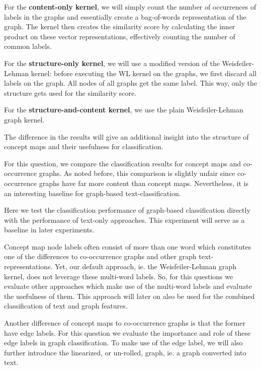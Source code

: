 For the \textbf{content-only kernel}, we will simply count the number of occurrences of labels in the graphs and essentially create a bag-of-words representation of the graph. The kernel then creates the similarity score by calculating the inner product on these vector representations, effectively counting the number of common labels.

For the \textbf{structure-only kernel}, we will use a modified version of the Weisfeiler-Lehman kernel: before executing the WL kernel on the graphs, we first discard all labels on the graph. All nodes of all graphs get the same label. This way, only the structure gets used for the similarity score.

For the \textbf{structure-and-content kernel}, we use the plain Weisfeiler-Lehman graph kernel. 

The difference in the results will give an additional insight into the structure of concept maps and their usefulness for classification.

For this question, we compare the classification results for concept maps and co-occurrence graphs. As noted before, this comparison is slightly unfair since co-occurrence graphs have far more content than concept maps.
Nevertheless, it is an interesting baseline for graph-based text-classification.

Here we test the classification performance of graph-based classification directly with the performance of text-only approaches.
This experiment will serve as a baseline in later experiments.

Concept map node labels often consist of more than one word which constitutes one of the differences to co-occurrence graphs and other graph text-representations.
Yet, our default approach, ie. the Weisfeiler-Lehman graph kernel, does not leverage these multi-word labels.
So, for this questions we evaluate other approaches which make use of the multi-word labels and evaluate the usefulness of them.
This approach will later on also be used for the combined classification of text and graph features.

Another difference of concept maps to co-occurrence graphs is that the former have edge labels.
For this question we evaluate the importance and role of these edge labels in graph classification.
To make use of the edge label, we will also further introduce the linearized, or un-rolled, graph, ie. a graph converted into text.


